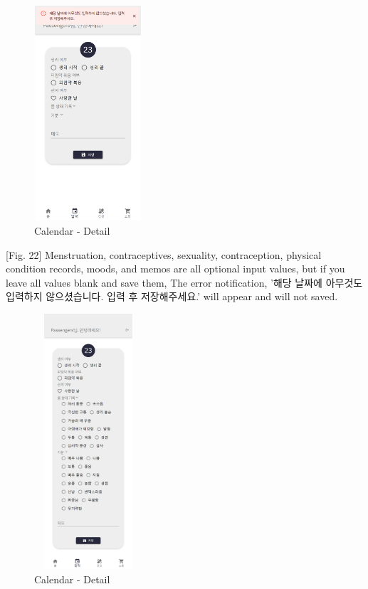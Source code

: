 \documentclass[conference]{IEEEtran}
\begin{document}
\begin{itemize}
\begin{enumerate}
        \begin{figure}[ht]
        \includegraphics[width=4cm, height=8cm, center]{calendar_detail2.png}
        \caption{Calendar - Detail}
        \label{fig22}
        \end{figure}
        
        [Fig. 22] Menstruation, contraceptives, sexuality, contraception, physical condition records, moods, and memos are all optional input values, but if you leave all values blank and save them, The error notification, '해당 날짜에 아무것도 입력하지 않으셨습니다. 입력 후 저장해주세요.' will appear and will not saved.
        
        \begin{figure}[ht]
        \includegraphics[width=4cm, height=9.5cm, center]{calendar_detail3.png}
        \caption{Calendar - Detail}
        \label{fig23}
        \end{figure}
        

\end{enumerate}
\end{itemize}
\end{document}
